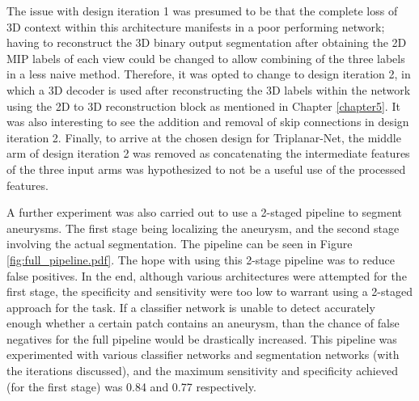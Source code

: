 The issue with design iteration 1 was presumed to be that the complete loss of 3D context within this architecture manifests in a poor performing network; having to reconstruct the 3D binary output segmentation after obtaining the 2D MIP labels of each view could be changed to allow combining of the three labels in a less naive method. Therefore, it was opted to change to design iteration 2, in which a 3D decoder is used after reconstructing the 3D labels within the network using the 2D to 3D reconstruction block as mentioned in Chapter \ref{chapter5}. It was also interesting to see the addition and removal of skip connections in design iteration 2. Finally, to arrive at the chosen design for Triplanar-Net, the middle arm of design iteration 2 was removed as concatenating the intermediate features of the three input arms was hypothesized to not be a useful use of the processed features.

A further experiment was also carried out to use a 2-staged pipeline to segment aneurysms. The first stage being localizing the aneurysm, and the second stage involving the actual segmentation. The pipeline can be seen in Figure \ref{fig:full_pipeline.pdf}. The hope with using this 2-stage pipeline was to reduce false positives. In the end, although various architectures were attempted for the first stage, the specificity and sensitivity were too low to warrant using a 2-staged approach for the task. If a classifier network is unable to detect accurately enough whether a certain patch contains an aneurysm, than the chance of false negatives for the full pipeline would be drastically increased. This pipeline was experimented with various classifier networks and segmentation networks (with the iterations discussed), and the maximum sensitivity and specificity achieved (for the first stage) was 0.84 and 0.77 respectively.





